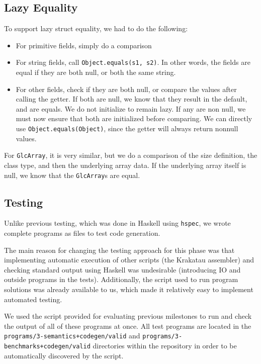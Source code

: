 \documentclass[11pt]{article}
\begin{document}
\subsection{Lazy Equality}

To support lazy struct equality, we had to do the following:

\begin{itemize}
	\item For primitive fields, simply do a comparison 
	\item For string fields, call \texttt{Object.equals(s1, s2)}. In other words, the fields are equal if they are both null, or both the same string.
	\item For other fields, check if they are both null, or compare the values after calling the getter. If both are null, we know that they result in the default, and are equals. We do not initialize to remain lazy. If any are non null, we must now ensure that both are initialized before comparing. We can directly use \texttt{Object.equals(Object)}, since the getter will always return nonnull values.
\end{itemize}

For \texttt{GlcArray}, it is very similar, but we do a comparison of the size definition, the class type, and then the underlying array data.
If the underlying array itself is null, we know that the \texttt{GlcArray}s are equal.

\subsection{Testing}
Unlike previous testing, which was done in Haskell using \texttt{hspec}, we
wrote complete programs as files to test code generation.

The main reason for changing the testing approach for this phase was
that
implementing automatic execution of other scripts (the Krakatau assembler) and
checking standard output using Haskell was undesirable (introducing IO
and outside programs in the tests). Additionally, the script used to run
program solutions was already available to us, which made it relatively easy
to implement automated testing.

We used the script provided for evaluating previous milestones to run and check
the output of all of these programs at once. All test programs are located
in the \texttt{programs/3-semantics+codegen/valid} and
\texttt{programs/3-benchmarks+codegen/valid} directories within the repository
in order to be automatically discovered by the script.
\end{document}

